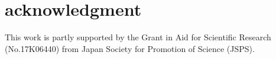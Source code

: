 \documentclass[conference]{IEEEtran}
\begin{document}
\section{acknowledgment}
This work is partly supported by the Grant in Aid for Scientific Research (No.17K06440) from Japan Society for Promotion of Science (JSPS).




\vspace{12pt}
\end{document}
